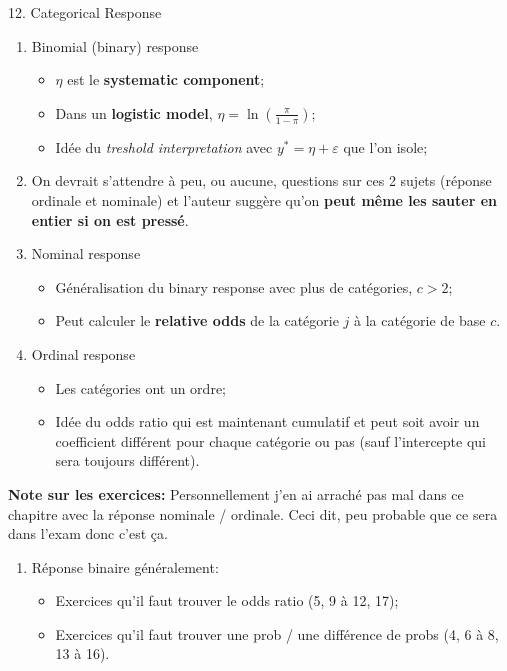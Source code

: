 \documentclass[12pt, titlepage, french]{report}
\begin{document}
\begin{CHPT_SUMM}[label = {GLM-CAT}]{12. Categorical Response}
\begin{enumerate}
	\item	Binomial (binary) response
	\begin{itemize}
		\item	$\eta$ est le \textbf{systematic component};
		\item	Dans un \textbf{logistic model}, $\eta = \ln\left( \frac{\pi}{1 - \pi} \right)$;
		\item	Idée du \textit{treshold interpretation} avec $y^{*} = \eta + \varepsilon$ que l'on isole;
	\end{itemize}
	\item[]	On devrait s'attendre à peu, ou aucune, questions sur ces 2 sujets (réponse ordinale et nominale) et l'auteur suggère qu'on \textbf{peut même les sauter en entier si on est pressé}.
	\item	Nominal response	
	\begin{itemize}
		\item	Généralisation du binary response avec plus de catégories, $c > 2$;
		\item	Peut calculer le \textbf{relative odds} de la catégorie $j$ à la catégorie de base $c$.
	\end{itemize}
	\item	Ordinal response
	\begin{itemize}
		\item	Les catégories ont un ordre;
		\item	Idée du odds ratio qui est maintenant cumulatif et peut soit avoir un coefficient différent pour chaque catégorie ou pas (sauf l'intercepte qui sera toujours différent).
	\end{itemize}
\end{enumerate}
\textbf{Note sur les exercices:} Personnellement j'en ai arraché pas mal dans ce chapitre avec la réponse nominale / ordinale. Ceci dit, peu probable que ce sera dans l'exam donc c'est ça.
\begin{enumerate}
	\item	Réponse binaire généralement:
	\begin{itemize}
		\item	Exercices qu'il faut trouver le odds ratio (5, 9 à 12, 17);
		\item	Exercices qu'il faut trouver une prob / une différence de probs (4, 6 à 8, 13 à 16).
	\end{itemize}

\end{enumerate}
\end{CHPT_SUMM}
\end{document}
